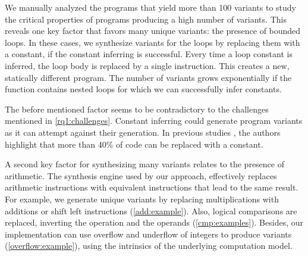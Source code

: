 We manually analyzed the programs that yield more than 100 variants to study the critical properties of programs producing a high number of variants.
This reveals one key factor that favors many unique variants: the presence of bounded loops. In these cases, we synthesize variants for the loops by replacing them with a constant, if the constant inferring \cite{souper} is successful. Every time a loop constant is inferred, the loop body is replaced by a single instruction. This creates a new, statically different program. The number of variants grows exponentially if the function contains nested loops for which we can successfully infer constants. 

% 
The before mentioned factor seems to be contradictory to the challenges mentioned in \autoref{rq1:challenges}. Constant inferring could generate program variants as it can attempt against their generation. In previous studies \citationneeded, the authors highlight that more than 40\% of code can be replaced with a constant. 

A second key factor for synthesizing many variants relates to the presence of arithmetic. The synthesis engine used by our approach, effectively replaces arithmetic instructions with equivalent instructions that lead to the same result. For example, we generate unique variants by replacing multiplications with additions or shift left instructions (\autoref{add:example}). Also, logical comparisons are replaced, inverting the operation and the operands (\autoref{cmp:examples}). Besides, our implementation can use overflow and underflow of integers to produce variants (\autoref{overflow:example}), using the intrinsics of the underlying computation model.


